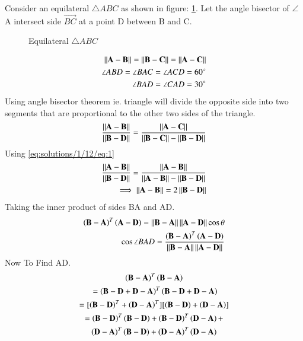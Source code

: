 Consider an equilateral $\triangle{ABC}$ as shown in figure:     \ref{eq:solutions/1/12/fig:es1}. Let the angle bisector of $\angle$A intersect side $\vec{BC}$ at a point D between B and C.
\renewcommand{\thefigure}{1}
\begin{figure}[!ht]
    \centering
    \resizebox{\columnwidth}{!}{}
    \caption{Equilateral $\triangle{ABC}$}
    \label{eq:solutions/1/12/fig:es1}
\end{figure}
\begin{align}
\label{eq:solutions/1/12/eq:1}\left\lVert\mathbf{A-B}\right\rVert=\left\lVert\mathbf{B-C}\right\rVert=\left\lVert\mathbf{A-C}\right\rVert\\
\angle ABD = \angle BAC = \angle ACD = 60\degree\\
\angle BAD = \angle CAD = 30\degree
\end{align}
Using angle bisector theorem ie. triangle will divide the opposite side into two segments that are proportional to the other two sides of the triangle.\\
\begin{align}
    \frac{\left\lVert\mathbf{A-B}\right\rVert}{\left\lVert\mathbf{B-D}\right\rVert}= \frac{\left\lVert\mathbf{A-C}\right\rVert}{\left\lVert\mathbf{B-C}\right\rVert-\left\lVert\mathbf{B-D}\right\rVert}
\end{align}
Using \eqref{eq:solutions/1/12/eq:1}
\begin{align}
     \frac{\left\lVert\mathbf{A-B}\right\rVert}{\left\lVert\mathbf{B-D}\right\rVert}= \frac{\left\lVert\mathbf{A-B}\right\rVert}{\left\lVert\mathbf{A-B}\right\rVert-\left\lVert\mathbf{B-D}\right\rVert}\\
     \implies\left\lVert\mathbf{A-B}\right\rVert = 2\left\lVert\mathbf{B-D}\right\rVert\label{eq:solutions/1/12/eq:es22}
\end{align}
Taking the inner product of sides BA and AD.
\begin{align}
    \left(\mathbf{B}-\mathbf{A}\right)^T\left(\mathbf{A}-\mathbf{D}\right) =
    \left\lVert\mathbf{B}-\mathbf{A}\right\rVert\left\lVert\mathbf{A}-\mathbf{D}\right\rVert\cos{\theta}\\
    \cos{\angle BAD}=\frac{\left(\mathbf{B}-\mathbf{A}\right)^T\left(\mathbf{A}-\mathbf{D}\right)}{\left\lVert\mathbf{B}-\mathbf{A}\right\rVert\left\lVert\mathbf{A}-\mathbf{D}\right\rVert}\label{eq:solutions/1/12/eq:13}
\end{align}
%
%
%
Now To Find AD.
\begin{multline}
 \brak{\vec{B-A}}^{T}\brak{\vec{B-A}}\\\ =\brak{\vec{B-D+D-A}}^{T}\brak{\vec{B-D+D-A}}\\
 = [\brak{\vec{B-D}}^{T}+\brak{\vec{D-A}}^{T}][\brak{\vec{B-D}}+\brak{\vec{D-A}}]\\
 =\brak{\vec{B-D}}^{T}\brak{\vec{B-D}} + \brak{\vec{B-D}}^{T}\brak{\vec{D-A}} +\\ \brak{\vec{D-A}}^{T}\brak{\vec{B-D}} + \brak{\vec{D-A}}^{T}\brak{\vec{D-A}}
\end{multline}
